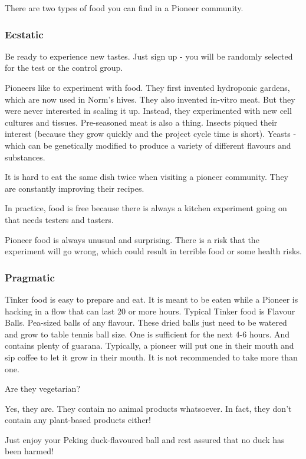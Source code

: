 There are two types of food you can find in a Pioneer community.

\subsubsection{Ecstatic}

Be ready to experience new tastes. Just sign up - you will be randomly selected for the test or the control group.

Pioneers like to experiment with food. They first invented hydroponic gardens, which are now used in Norm's hives. They also invented in-vitro meat. But they were never interested in scaling it up. Instead, they experimented with new cell cultures and tissues. Pre-seasoned meat is also a thing.
Insects piqued their interest (because they grow quickly and the project cycle time is short). Yeasts - which can be genetically modified to produce a variety of different flavours and substances.

It is hard to eat the same dish twice when visiting a pioneer community. They are constantly improving their recipes.

In practice, food is free because there is always a kitchen experiment going on that needs testers and tasters.

Pioneer food is always unusual and surprising. There is a risk that the experiment will go wrong, which could result in terrible food or some health risks.

\subsubsection{Pragmatic}

Tinker food is easy to prepare and eat. It is meant to be eaten while a Pioneer is hacking in a flow that can last 20 or more hours. Typical Tinker food is Flavour Balls. Pea-sized balls of any flavour. These dried balls just need to be watered and grow to table tennis ball size. One is sufficient for the next 4-6 hours. And contains plenty of guarana.
Typically, a pioneer will put one in their mouth and sip coffee to let it grow in their mouth. It is not recommended to take more than one.

Are they vegetarian?

Yes, they are. They contain no animal products whatsoever. In fact, they don't contain any plant-based products either!

Just enjoy your Peking duck-flavoured ball and rest assured that no duck has been harmed!

